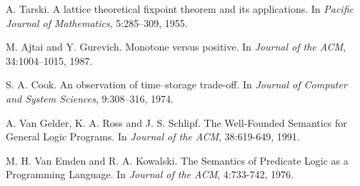 \documentclass[11pt]{article}
\begin{document}
\begin{thebibliography}{9}
  A. Tarski. 
  A lattice theoretical fixpoint theorem and its applications. 
  In \textit{Pacific Journal of Mathematics}, 5:285–309, 1955.

  M. Ajtai and Y. Gurevich. 
  Monotone versus positive. 
  In \textit{Journal of the ACM}, 34:1004–1015, 1987.

  S. A. Cook. 
  An observation of time–storage trade-off. 
  In \textit{Journal of Computer and System Sciences}, 9:308–316, 1974.

  A. Van Gelder, K. A. Ross and J. S. Schlipf.
  The Well-Founded Semantics for General Logic Programs.
  In \textit{Journal of the ACM}, 38:619-649, 1991.
  
  M. H. Van Emden and R. A. Kowalski.
  The Semantics of Predicate Logic as a Programming Language.
  In \textit{Journal of the ACM}, 4:733-742, 1976.
\end{thebibliography}
\end{document}
